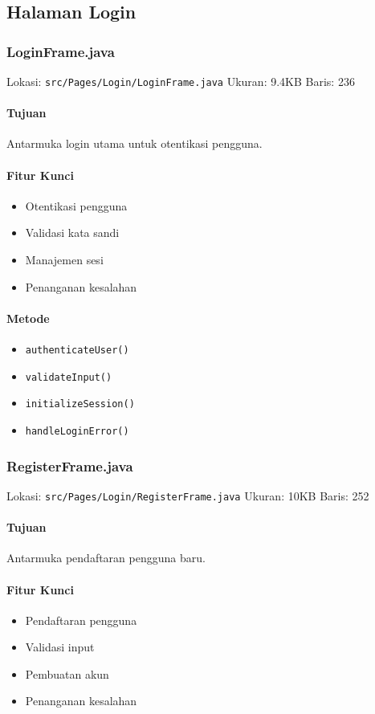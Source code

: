 \documentclass[12pt,a4paper]{article}
\begin{document}
\subsection{Halaman Login}
\subsubsection{LoginFrame.java}
Lokasi: \texttt{src/Pages/Login/LoginFrame.java}
Ukuran: 9.4KB
Baris: 236

\paragraph{Tujuan}
Antarmuka login utama untuk otentikasi pengguna.

\paragraph{Fitur Kunci}
\begin{itemize}
    \item Otentikasi pengguna
    \item Validasi kata sandi
    \item Manajemen sesi
    \item Penanganan kesalahan
\end{itemize}

\paragraph{Metode}
\begin{itemize}
    \item \texttt{authenticateUser()}
    \item \texttt{validateInput()}
    \item \texttt{initializeSession()}
    \item \texttt{handleLoginError()}
\end{itemize}

\subsubsection{RegisterFrame.java}
Lokasi: \texttt{src/Pages/Login/RegisterFrame.java}
Ukuran: 10KB
Baris: 252

\paragraph{Tujuan}
Antarmuka pendaftaran pengguna baru.

\paragraph{Fitur Kunci}
\begin{itemize}
    \item Pendaftaran pengguna
    \item Validasi input
    \item Pembuatan akun
    \item Penanganan kesalahan
\end{itemize}
\end{document}

